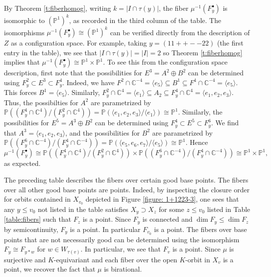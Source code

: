 \documentclass[11pt,letterpaper,reqno]{amsart}
\numberwithin{equation}{section}
\theoremstyle{plain}
\theoremstyle{definition}
\theoremstyle{remark}
\newcommand{\C}{\mathbb{C}}
\renewcommand{\P}{\mathbb{P}}
\begin{document}
By Theorem \ref{t:fiberhomog}, writing $k = | I \cap \tau(y) |$, the fiber
 $\mu^{-1}(F_y^\bullet)$ is isomorphic to $(\P^1)^k$, as recorded in the third column
of the table.
 The isomorphisms $\mu^{-1}(F_y^\bullet) \cong (\P^1)^k$
 can be verified directly from the description of $Z$ as a configuration space.
 For example,
 taking $y = (11++--22)$ (the first entry in the table), we see that $| I \cap \tau(y)| = | I | = 2$
 so Theorem \ref{t:fiberhomog} implies that  $\mu^{-1}(F_y^\bullet) \cong \P^1\times\P^1$.  To
 see this from the
 configuration space description, first note that the possibilities for $E^3 = A^2 \oplus B^2$ can
 be determined using $F_y^2 \subset E^3 \subset F_y^4$.  Indeed, we have
 $F^2 \cap \C^{-4} =  \langle e_5 \rangle     \subseteq B^1 \subseteq F^4 \cap \C^{-4}  = \langle e_5 \rangle$.  
 This forces $B^1 = \langle e_5 \rangle$.  Similarly,
 $F_y^2 \cap \C^{4} = \langle e_1 \rangle  \subseteq A_2 \subseteq F_y^4 \cap \C^{4} = \langle e_1,e_2, e_3 \rangle$.
 Thus, the possibilties for $A^2$ are parametrized by
 $\P((F_y^4 \cap \C^{4})/(F_y^2 \cap \C^{4}) )= \P(\langle e_1,e_2, e_3 \rangle/\langle e_1 \rangle ) \cong \P^1$.
 Similarly, the possibilities for $E^5 = A^3 \oplus B^2$ can be determined using
 $F_y^4 \subset E^5 \subset F_y^6$.  We find that $A^3 = \langle e_1, e_2, e_3 \rangle$, and the
 possibilities for $B^2$ are parametrized by 
 $\P((F_y^6 \cap \C^{-4})/(F_y^4 \cap \C^{-4})) = \P(\langle e_5, e_6, e_7 \rangle / \langle e_5 \rangle ) \cong \P^1$.
 Hence
 $$
 \mu^{-1}(F_y^\bullet) \cong \P((F_y^4 \cap \C^{4})/(F_y^2 \cap \C^{4}) ) \times \P((F_y^6 \cap \C^{-4})/(F_y^4 \cap \C^{-4})) \cong \P^1 \times \P^1,
 $$
as expected.

The preceding table describes the fibers over certain good base points.  The fibers over all other good base
points are points.  Indeed, by inspecting the closure order for orbits
contained in $X_{v_0}$ depicted in Figure \ref{figure: 1+1223-3}, one sees that
any $y \leq v_0$ not listed in the table satisfies $X_y \supset X_z$ for some $z \leq v_0$ listed in Table \ref{table:fibers}
such that $F_z$ is a point.  Since $F_y$ is connected and $\dim F_y \le \dim F_z$ by semicontinuity,
$F_y$ is a point.  In particular $F_{v_0}$ is a point.  The fibers over base points that are not necessarily good can be
determined using the isomorphism $F_y \cong F_{y*w}$ for $w \in W_{\tau(v)}$.  In particular, we see that 
$F_v$ is a point.  Since $\mu$ is surjective and $K$-equivariant and each fiber over the open $K$-orbit in $X_v$ is a point,
we recover the fact that $\mu$ is birational.
\end{document}
